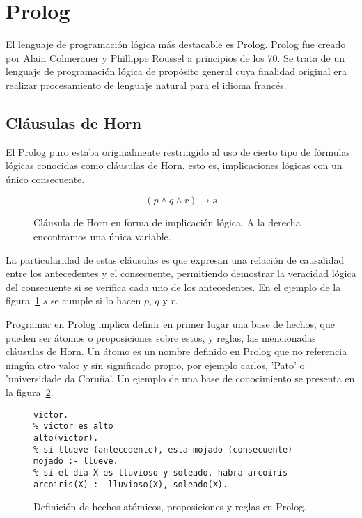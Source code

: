\documentclass[11pt,captions=nooneline,DIV=14, parskip=full]{scrartcl}
\begin{document}
\section{Prolog}
\label{sec:prolog}

El lenguaje de programación lógica más destacable es Prolog. Prolog fue creado por Alain Colmerauer y Phillippe Roussel a principios de los 70. Se trata de un lenguaje de programación lógica de propósito general cuya finalidad original era realizar procesamiento de lenguaje natural para el idioma francés.

\subsection{Cláusulas de Horn}
\label{subsec:horn}
El Prolog puro estaba originalmente restringido al uso de cierto tipo de fórmulas lógicas conocidas como cláusulas de Horn, esto es, implicaciones lógicas con un único consecuente.

\begin{figure}[!htbp]
{\Large{\[ ( p \land q \land r ) \to s \]}}%
\caption{Cláusula de Horn en forma de implicación lógica. A la derecha encontramos una única variable.}
\label{fig:horn}
\end{figure}

La particularidad de estas cláusulas es que expresan una relación de causalidad entre los antecedentes y el consecuente, permitiendo demostrar la veracidad lógica del consecuente si se verifica cada uno de los antecedentes. En el ejemplo de la figura~\ref{fig:horn} $ s $ se cumple si lo hacen $ p $, $ q $ y $r $.

Programar en Prolog implica definir en primer lugar una base de hechos, que pueden ser átomos o proposiciones sobre estos, y reglas, las mencionadas cláusulas de Horn. Un átomo es un nombre definido en Prolog que no referencia ningún otro valor y sin significado propio, por ejemplo carlos, 'Pato' o 'universidade da Coruña'. Un ejemplo de una base de conocimiento se presenta en la figura~\ref{fig:knowledge}.

\begin{figure}[!htbp]
\lstset{language=Prolog}
\begin{lstlisting}[frame=single]
% atomo victor: victor existe
victor.
% victor es alto
alto(victor).
% si llueve (antecedente), esta mojado (consecuente)
mojado :- llueve.
% si el dia X es lluvioso y soleado, habra arcoiris
arcoiris(X) :- lluvioso(X), soleado(X).	
\end{lstlisting} 
\caption{Definición de hechos atómicos, proposiciones y reglas en Prolog.}
\label{fig:knowledge}
\end{figure}
\end{document}
